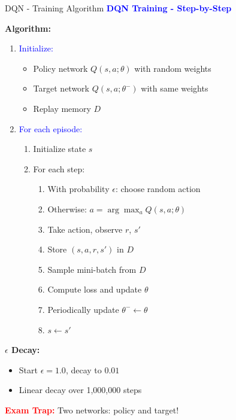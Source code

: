 \documentclass[8pt]{beamer}
\begin{document}
	\begin{frame}{DQN - Training Algorithm}
		\fontsize{6.5}{7.5}\selectfont
		\textcolor{blue}{\textbf{DQN Training - Step-by-Step}}
		
		\textbf{Algorithm:}
		\begin{enumerate}
			\item \textcolor{blue}{Initialize:}
			\begin{itemize}
				\item Policy network $Q(s,a;\theta)$ with random weights
				\item Target network $Q(s,a;\theta^-)$ with same weights
				\item Replay memory $D$
			\end{itemize}
			
			\item \textcolor{blue}{For each episode:}
			\begin{enumerate}
				\item Initialize state $s$
				\item For each step:
				\begin{enumerate}
					\item With probability $\epsilon$: choose random action
					\item Otherwise: $a = \arg\max_a Q(s,a;\theta)$
					\item Take action, observe $r$, $s'$
					\item Store $(s,a,r,s')$ in $D$
					\item Sample mini-batch from $D$
					\item Compute loss and update $\theta$
					\item Periodically update $\theta^- \leftarrow \theta$
					\item $s \leftarrow s'$
				\end{enumerate}
			\end{enumerate}
		\end{enumerate}
		
		\textbf{$\epsilon$ Decay:}
		\begin{itemize}
			\item Start $\epsilon = 1.0$, decay to $0.01$
			\item Linear decay over 1,000,000 steps
		\end{itemize}
		
		\textcolor{red}{\textbf{Exam Trap:}} Two networks: policy and target!
	\end{frame}
	
\end{document}

